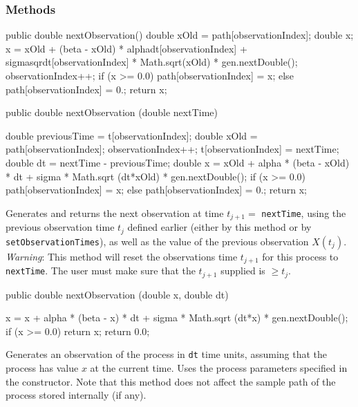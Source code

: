 \subsubsection* {Methods}
\begin{code}\begin{hide}

   public double nextObservation() {
      double xOld = path[observationIndex];
      double x;
      x = xOld + (beta - xOld) * alphadt[observationIndex]
           + sigmasqrdt[observationIndex] * Math.sqrt(xOld) * gen.nextDouble();
      observationIndex++;
      if (x >= 0.0)
         path[observationIndex] = x;
      else
         path[observationIndex] = 0.;
      return x;
   }

\end{hide}
   public double nextObservation (double nextTime) \begin{hide} {
      double previousTime = t[observationIndex];
      double xOld = path[observationIndex];
      observationIndex++;
      t[observationIndex] = nextTime;
      double dt = nextTime - previousTime;
      double x = xOld + alpha * (beta - xOld) * dt
           + sigma * Math.sqrt (dt*xOld) * gen.nextDouble();
      if (x >= 0.0)
         path[observationIndex] = x;
      else
         path[observationIndex] = 0.;
      return x;
   }\end{hide}
\end{code}
\begin{tabb} Generates and returns the next observation at time $t_{j+1} =$
 \texttt{nextTime}, using the previous observation time $t_{j}$ defined earlier
(either by this method or by \texttt{setObservation\-Times}),
as well as the value of the previous observation $X(t_j)$.
\emph{Warning}: This method will reset the observations time $t_{j+1}$
for this process to \texttt{nextTime}. The user must make sure that
the $t_{j+1}$ supplied is $\geq t_{j}$.
\end{tabb}
\begin{code}

   public double nextObservation (double x, double dt) \begin{hide} {
      x = x + alpha * (beta - x) * dt +
          sigma * Math.sqrt (dt*x) * gen.nextDouble();
      if (x >= 0.0)
         return x;
      return 0.0;
   }\end{hide}
\end{code}
\begin{tabb} Generates an observation of the process in \texttt{dt} time units,
assuming that the process has value $x$ at the current time.
Uses the process parameters specified in the constructor.
Note that this method does not affect the sample path of the process
stored internally (if any).
\end{tabb}
